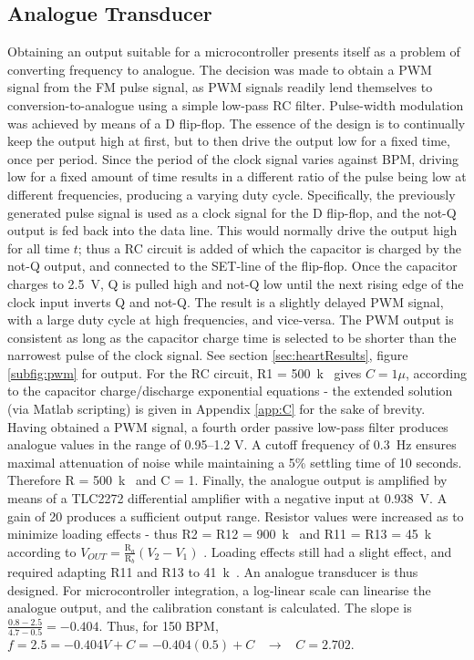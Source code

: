 	\subsection{Analogue Transducer}
Obtaining an output suitable for a microcontroller presents itself as a problem of converting frequency to analogue. The decision was made to obtain a PWM signal from the FM pulse signal, as PWM signals readily lend themselves to conversion-to-analogue using a simple low-pass RC filter. Pulse-width modulation was achieved by means of a D flip-flop. The essence of the design is to continually keep the output high at first, but to then drive the output low for a fixed time, once per period. Since the period of the clock signal varies against BPM, driving low for a fixed amount of time results in a different ratio of the pulse being low at different frequencies, producing a varying duty cycle. Specifically, the previously generated pulse signal is used as a clock signal for the D flip-flop, and the not-Q output is fed back into the data line. This would normally drive the output high for all time $t$; thus a RC circuit is added of which the capacitor is charged by the not-Q output, and connected to the SET-line of the flip-flop. Once the capacitor charges to \SI{2.5}{V}, Q is pulled high and not-Q low until the next rising edge of the clock input inverts Q and not-Q. The result is a slightly delayed PWM signal, with a large duty cycle at high frequencies, and vice-versa. The PWM output is consistent as long as the capacitor charge time is selected to be shorter than the narrowest pulse of the clock signal. See section \ref{sec:heartResults}, figure \ref{subfig:pwm} for output. For the RC circuit, R1 = \SI{500}{k\Omega} gives $C = 1\mu$, according to the capacitor charge/discharge exponential equations - the extended solution (via Matlab scripting) is given in Appendix \ref{app:C} for the sake of brevity. Having obtained a PWM signal, a fourth order passive low-pass filter produces analogue values in the range of \numrange{0.95}{1.2} \si{V}. A cutoff frequency of \SI{0.3}{Hz} ensures maximal attenuation of noise while maintaining a 5\% settling time of 10 seconds. Therefore R = \SI{500}{k\Omega} and C = \SI{1}{\mu}. Finally, the analogue output is amplified by means of a TLC2272 differential amplifier with a negative input at \SI{0.938}{V}. A gain of 20 produces a sufficient output range. Resistor values were increased as to minimize loading effects - thus R2 = R12 = \SI{900}{k\Omega} and R11 = R13 = \SI{45}{k\Omega} according to ${V}_{{OUT}}=\frac{\mathrm{R}_{a}}{\mathrm{R}_{b}}\left({V}_{2}-{V}_{1}\right)$ \cite{opamp}. Loading effects still had a slight effect, and required adapting R11 and R13 to \SI{41}{k\Omega}. An analogue transducer is thus designed. For microcontroller integration, a log-linear scale can linearise the analogue output, and the calibration constant is calculated. The slope is $\frac{0.8-2.5}{4.7-0.5} = -0.404$. Thus, for 150 BPM, $f = 2.5 = -0.404V + C = -0.404(0.5) + C \;\;\; \rightarrow \;\;\; C = 2.702$.\\

